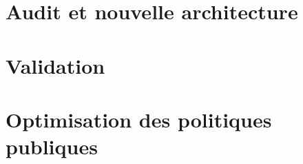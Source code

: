 \documentclass[11pt,a4paper,twoside,openany]{book}
\begin{document}
\sloppy
\frontmatter

\tableofcontents

\mainmatter
\part{Audit et nouvelle architecture}

\part{Validation}

\part{Optimisation des politiques publiques}



\appendix

\backmatter

\end{document}
